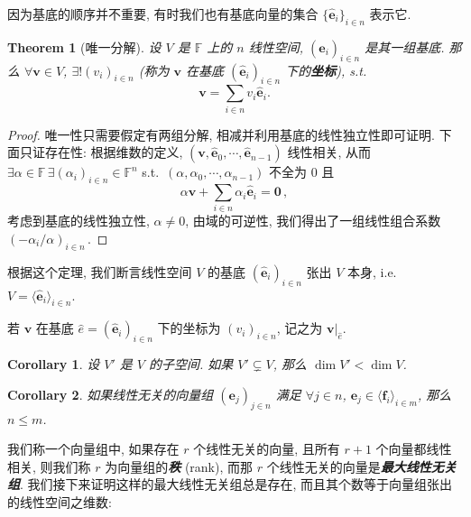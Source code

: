 \documentclass[openany]{ctexbook}
\newcommand*{\indexbf}[1]{\emph{\textbf{#1}}\index{#1}} %
\theoremstyle{plain}
\newtheorem{theorem}{Theorem}[section] %
\newtheorem{corollary}{Corollary} %
\theoremstyle{definition}
\newcommand*{\basis}[1]{\hat{\boldsymbol{#1}}} %
\newcommand*{\bv}{\boldsymbol} %
\newcommand*{\inbasis}[2]{\left.%
	{#1}\right|_{#2}
}
\begin{document}
因为基底的顺序并不重要, 有时我们也有基底向量的集合 $\{\basis e_i\}_{i \in n}$ 表示它.

\begin{theorem}[唯一分解]\label{theorem:唯一分解}
	设 $V$ 是 $\mathbb F$ 上的 $n$ 线性空间, $(\basis e_i)_{i \in n}$ 是其一组基底.
	那么 $\forall \bv v \in V$, $\exists ! (v_i)_{i \in n}$ (称为 $\bv v$ 在基底 $(\basis e_i)_{i \in n}$ 下的\indexbf{坐标}), s.t.\ 
	\begin{equation*}
		\bv v = \sum_{i \in n} v_i \basis e_i.
	\end{equation*}
\end{theorem}
\begin{proof}
	唯一性只需要假定有两组分解, 相减并利用基底的线性独立性即可证明. 
	下面只证存在性:
	根据维数的定义, $(\bv v, \basis e_0, \cdots, \basis e_{n - 1})$ 线性相关, 从而
	$\exists \alpha \in \mathbb F\, \exists (\alpha_i)_{i \in n} \in \mathbb F^n$ s.t.\ $(\alpha, \alpha_0, \cdots, \alpha_{n - 1})$ 不全为 $0$ 且
	\begin{equation*}
		\alpha \bv v + \sum_{i \in n} \alpha_i \basis e_i = \bv 0\,,
	\end{equation*}
	考虑到基底的线性独立性, $\alpha \neq 0$, 由域的可逆性, 我们得出了一组线性组合系数 $( - \alpha_i / \alpha)_{i \in n}$\,.
\end{proof}

根据这个定理, 我们断言线性空间 $V$ 的基底 $(\basis e_i)_{i \in n}$ 张出 $V$ 本身, 
i.e.\ $V = \langle\basis e_i\rangle_{i \in n}$. 

若 $\bv v$ 在基底 $\hat e = (\basis e_i)_{i \in n}$ 下的坐标为 $(v_i)_{i \in n}$, 记之为 $\inbasis{\bv v}{\hat e}$. 

\begin{corollary}
	设 $V'$ 是 $V$ 的子空间. 如果 $V' \subsetneq V$, 那么 $\dim V' < \dim V$.
\end{corollary}

\begin{corollary}\label{corollary:向量组线性表出的向量组秩不多于自身}
	如果线性无关的向量组 $(\bv e_j)_{j \in n} $ 满足 $\forall j \in n$, $\bv e_j \in  \langle\bv f_i\rangle_{i \in m}$, 那么 $n \leq m$.
\end{corollary}

我们称一个向量组中, 如果存在 $r$ 个线性无关的向量, 且所有 $r + 1$ 个向量都线性相关, 则我们称 $r$ 为向量组的\indexbf{秩} (rank), 而那 $r$ 个线性无关的向量是\indexbf{最大线性无关组}.
我们接下来证明这样的最大线性无关组总是存在, 而且其个数等于向量组张出的线性空间之维数:
\end{document}
